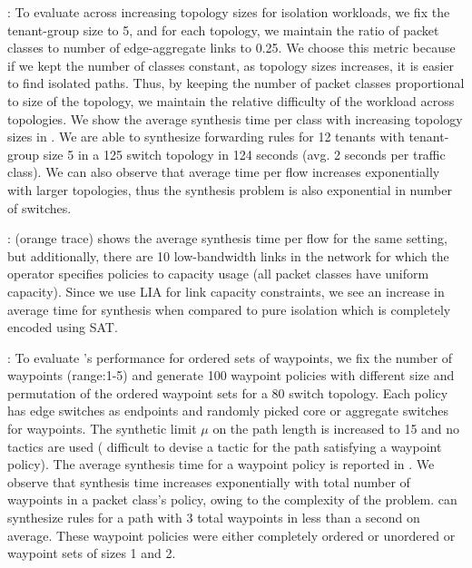 : To evaluate \Name across
increasing topology sizes for isolation workloads, we fix the
tenant-group size to 5, and for each topology, we maintain the ratio
of packet classes to number of edge-aggregate links to 0.25.  We
choose this metric because if we kept the number of classes constant,
as topology sizes increases, it is easier to find isolated
paths. Thus, by keeping the number of packet classes proportional to
size of the topology, we maintain the relative difficulty of the
workload across topologies.  We show the average synthesis time per
class with increasing topology sizes in
.  We are able to synthesize forwarding rules
for 12 tenants with tenant-group size 5 in a 125 switch topology in 124
seconds (avg. 2 seconds per traffic class).
We can also observe that average time per flow increases exponentially
with larger topologies, thus the synthesis problem is also exponential
in number of switches.
  
  
 : 
 (orange trace) shows the average synthesis time per flow for the same setting, but
 additionally, there are 10 low-bandwidth links in the network for which the operator
 specifies policies to capacity usage (all packet classes have uniform capacity). 
Since we use LIA for link capacity constraints, we see an 
increase in average time for synthesis 
when compared to pure isolation which is completely 
encoded using SAT. 

: To evaluate \Name's performance for
ordered sets of waypoints, we fix the number of waypoints (range:1-5)
and generate 100 waypoint policies with different size and permutation
of the ordered waypoint sets for a 80 switch topology. Each
policy has edge switches as endpoints and randomly picked core or
aggregate switches for waypoints. The synthetic limit $\mu$ on the
path length is increased to 15 and no tactics are used (
difficult to devise a tactic for the path satisfying a waypoint policy). The
average synthesis time for a waypoint policy is reported in
.  We observe that synthesis time increases
exponentially with total number of waypoints in a packet class's
policy, owing to the complexity of the problem.  \Name can synthesize
rules for a path with 3 total waypoints in less than a second on
average. These waypoint policies were either completely ordered or
unordered or waypoint sets of sizes 1 and 2.

